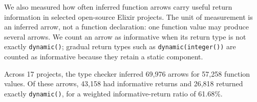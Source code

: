 We also measured how often inferred function arrows carry useful return
information in selected open-source Elixir projects.  The unit of measurement
is an inferred arrow, not a function declaration: one function value may produce
several arrows.  We count an arrow as informative when its return type is not
exactly \texttt{dynamic()}; gradual return types such as
\texttt{dynamic(integer())} are counted as informative because they retain a
static component.

Across 17 projects, the type checker inferred 69,976 arrows for 57,258
function values.  Of these arrows, 43,158 had informative returns and 26,818
returned exactly \texttt{dynamic()}, for a weighted informative-return ratio of
61.68\%.

